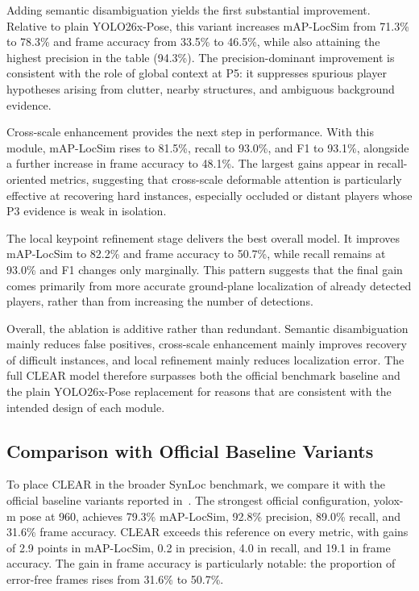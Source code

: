 Adding semantic disambiguation yields the first substantial improvement. Relative to plain YOLO26x-Pose, this variant increases mAP-LocSim from 71.3\% to 78.3\% and frame accuracy from 33.5\% to 46.5\%, while also attaining the highest precision in the table (94.3\%). The precision-dominant improvement is consistent with the role of global context at P5: it suppresses spurious player hypotheses arising from clutter, nearby structures, and ambiguous background evidence.

Cross-scale enhancement provides the next step in performance. With this module, mAP-LocSim rises to 81.5\%, recall to 93.0\%, and F1 to 93.1\%, alongside a further increase in frame accuracy to 48.1\%. The largest gains appear in recall-oriented metrics, suggesting that cross-scale deformable attention is particularly effective at recovering hard instances, especially occluded or distant players whose P3 evidence is weak in isolation.

The local keypoint refinement stage delivers the best overall model. It improves mAP-LocSim to 82.2\% and frame accuracy to 50.7\%, while recall remains at 93.0\% and F1 changes only marginally. This pattern suggests that the final gain comes primarily from more accurate ground-plane localization of already detected players, rather than from increasing the number of detections.

Overall, the ablation is additive rather than redundant. Semantic disambiguation mainly reduces false positives, cross-scale enhancement mainly improves recovery of difficult instances, and local refinement mainly reduces localization error. The full CLEAR model therefore surpasses both the official benchmark baseline and the plain YOLO26x-Pose replacement for reasons that are consistent with the intended design of each module.

\subsection{Comparison with Official Baseline Variants}
\label{sec:comparison-official}

To place CLEAR in the broader SynLoc benchmark, we compare it with the official baseline variants reported in~\cite{ardo2025}. The strongest official configuration, yolox-m pose at 960, achieves 79.3\% mAP-LocSim, 92.8\% precision, 89.0\% recall, and 31.6\% frame accuracy. CLEAR exceeds this reference on every metric, with gains of 2.9 points in mAP-LocSim, 0.2 in precision, 4.0 in recall, and 19.1 in frame accuracy. The gain in frame accuracy is particularly notable: the proportion of error-free frames rises from 31.6\% to 50.7\%.

